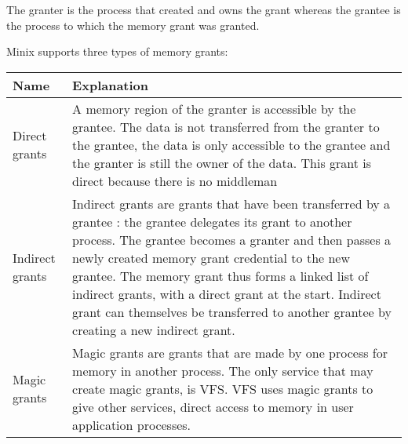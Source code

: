 The granter is the process that created and owns the grant whereas the
grantee is the process to which the memory grant was granted.

Minix supports three types of memory grants:

\begin{longtable}[]{@{}ll@{}}
\toprule
\begin{minipage}[b]{0.30\columnwidth}\raggedright
Name\strut
\end{minipage} & \begin{minipage}[b]{0.64\columnwidth}\raggedright
Explanation\strut
\end{minipage}\tabularnewline
\midrule
\endhead
\begin{minipage}[t]{0.30\columnwidth}\raggedright
Direct grants\strut
\end{minipage} & \begin{minipage}[t]{0.64\columnwidth}\raggedright
A memory region of the granter is accessible by the grantee. The data is
not transferred from the granter to the grantee, the data is only
accessible to the grantee and the granter is still the owner of the
data. This grant is direct because there is no middleman\strut
\end{minipage}\tabularnewline
\begin{minipage}[t]{0.30\columnwidth}\raggedright
Indirect grants\strut
\end{minipage} & \begin{minipage}[t]{0.64\columnwidth}\raggedright
Indirect grants are grants that have been transferred by a grantee : the
grantee delegates its grant to another process. The grantee becomes a
granter and then passes a newly created memory grant credential to the
new grantee. The memory grant thus forms a linked list of indirect
grants, with a direct grant at the start. Indirect grant can themselves
be transferred to another grantee by creating a new indirect
grant.\strut
\end{minipage}\tabularnewline
\begin{minipage}[t]{0.30\columnwidth}\raggedright
Magic grants\strut
\end{minipage} & \begin{minipage}[t]{0.64\columnwidth}\raggedright
Magic grants are grants that are made by one process for memory in
another process. The only service that may create magic grants, is VFS.
VFS uses magic grants to give other services, direct access to memory in
user application processes.\strut
\end{minipage}\tabularnewline
\bottomrule
\end{longtable}

